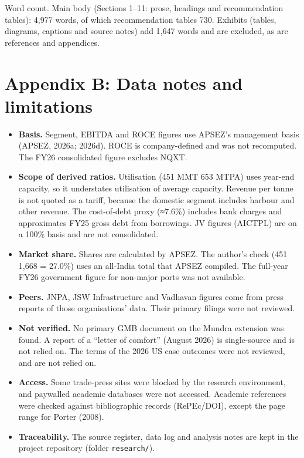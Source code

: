 \documentclass[12pt, a4paper]{article}
\begin{document}
{\footnotesize
Word count. Main body (Sections 1--11: prose, headings and recommendation
tables): 4,977 words, of which recommendation tables 730. Exhibits (tables,
diagrams, captions and source notes) add 1,647 words and are excluded, as are
references and appendices.\par}

\vspace{4mm}
\section*{Appendix B: Data notes and limitations}
\label{app:data}
{\footnotesize
\begin{itemize}
  \item \textbf{Basis.} Segment, EBITDA and ROCE figures use APSEZ's management
        basis (APSEZ, 2026a; 2026d). ROCE is company-defined and was not
        recomputed. The FY26 consolidated figure excludes NQXT.
  \item \textbf{Scope of derived ratios.} Utilisation (451 MMT \textdiv{} 653
        MTPA) uses year-end capacity, so it understates utilisation of average
        capacity. Revenue per tonne is not quoted as a tariff, because the
        domestic segment includes harbour and other revenue. The cost-of-debt
        proxy (≈7.6\%) includes bank charges and approximates FY25 gross debt
        from borrowings. JV figures (AICTPL) are on a 100\% basis and are not
        consolidated.
  \item \textbf{Market share.} Shares are calculated by APSEZ. The author's
        check (451 \textdiv{} 1,668 = 27.0\%) uses an all-India total that APSEZ
        compiled. The full-year FY26 government figure for non-major ports was
        not available.
  \item \textbf{Peers.} JNPA, JSW Infrastructure and Vadhavan figures come from
        press reports of those organisations' data. Their primary filings were
        not reviewed.
  \item \textbf{Not verified.} No primary GMB document on the Mundra extension
        was found. A report of a ``letter of comfort'' (August 2026) is
        single-source and is not relied on. The terms of the 2026 US case
        outcomes were not reviewed, and are not relied on.
  \item \textbf{Access.} Some trade-press sites were blocked by the research
        environment, and paywalled academic databases were not accessed.
        Academic references were checked against bibliographic records
        (RePEc/DOI), except the page range for Porter (2008).
  \item \textbf{Traceability.} The source register, data log and analysis notes
        are kept in the project repository (folder \texttt{research/}).
\end{itemize}}
\end{document}
